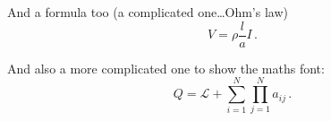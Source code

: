 \documentclass[../main.tex]{subfiles}
\begin{document}
And a formula too (a complicated one\dots Ohm's law)
\begin{equation}
V=\rho\frac{l}{a}I\,.
\end{equation}

And also a more complicated one to show the maths font:
\begin{equation}
Q=\mathcal{L}+\sum_{i=1}^{N}\prod_{j=1}^{N}a_{ij}\,.
\end{equation}
\end{document}
